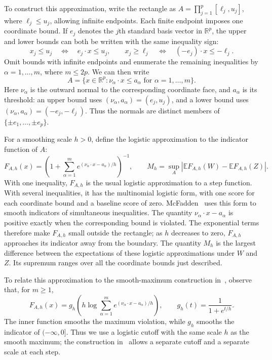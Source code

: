 \documentclass[11pt,letterpaper]{article}
\newif\ifshowrev
\newcommand{\rev}[1]{\ifshowrev{\color{revblue}%
\hypersetup{linkcolor=revblue,citecolor=revblue,urlcolor=revblue}#1}\else#1\fi}
\newif\ifshownat
\newcommand{\nat}[1]{\ifshownat{\color{revblue}%
\hypersetup{linkcolor=revblue,citecolor=revblue,urlcolor=revblue}#1}\else#1\fi}
\theoremstyle{remark}
\newcommand{\E}{\mathbb E}
\newcommand{\R}{\mathbb R}
\begin{document}
To construct this approximation, write the rectangle as
\(A=\prod_{j=1}^p[\ell_j,u_j]\), where \(\ell_j\le u_j\),
allowing infinite endpoints.
Each finite endpoint imposes one coordinate bound. If \(e_j\) denotes
the \(j\)th standard basis vector in \(\R^p\), the upper and lower
bounds can both be written with the same inequality sign:
\[
 x_j\le u_j
 \quad\Longleftrightarrow\quad e_j\cdot x\le u_j,
 \qquad
 x_j\ge\ell_j
 \quad\Longleftrightarrow\quad (-e_j)\cdot x\le-\ell_j.
\]
Omit bounds with infinite endpoints and enumerate the remaining
inequalities by \(\alpha=1,\ldots,m\), where \(m\le2p\). We can
then write
\[
 A=\{x\in\R^p:\nu_\alpha\cdot x\le a_\alpha
                 \text{ for }\alpha=1,\ldots,m\}.
\]
Here \(\nu_\alpha\) is the outward normal to the corresponding
coordinate face, and \(a_\alpha\) is its threshold: an upper bound
uses \((\nu_\alpha,a_\alpha)=(e_j,u_j)\), and a lower bound uses
\((\nu_\alpha,a_\alpha)=(-e_j,-\ell_j)\).
Thus the normals are distinct members of
\(\{\pm e_1,\ldots,\pm e_p\}\).

For a smoothing scale \(h>0\), define the logistic approximation to
the indicator function of \(A\):
\begin{equation}
 F_{A,h}(x)=\left(1+\sum_{\alpha=1}^m
          e^{(\nu_\alpha\cdot x-a_\alpha)/h}\right)^{-1},
 \qquad M_h=\sup_A|\E F_{A,h}(W)-\E F_{A,h}(Z)|.
 \label{eq:selector}
\end{equation}
With one inequality, \(F_{A,h}\) is the usual logistic approximation
to a step function. With several inequalities, it has the multinomial
logistic form, with one score for each coordinate bound and a baseline
score of zero. McFadden~\cite[p.~1001]{McFadden1989} uses this form
to smooth indicators of simultaneous inequalities.
\rev{}
The quantity \(\nu_\alpha\cdot x-a_\alpha\) is positive exactly
when the corresponding bound is violated. The exponential terms
therefore make \(F_{A,h}\) small outside the rectangle; as \(h\)
decreases to zero, \(F_{A,h}\) approaches its indicator away from
the boundary. The quantity \(M_h\) is the largest difference between
the expectations of these logistic approximations under \(W\) and \(Z\).
Its supremum ranges over all the coordinate bounds just described.

To relate this approximation to the smooth-maximum construction
in~\cite{CCK2013}, observe that, for \(m\ge1\),
\[
 F_{A,h}(x)=g_h\!\left(h\log\sum_{\alpha=1}^m
 e^{(\nu_\alpha\cdot x-a_\alpha)/h}\right),
 \qquad g_h(t)=\frac{1}{1+e^{t/h}}.
\]
The inner function smooths the maximum violation, while \(g_h\)
smooths the indicator of \(({-\infty},0]\). Thus we use a logistic
cutoff with the same scale \(h\) as the smooth maximum; the
construction in~\cite{CCK2013} allows a separate cutoff and a
separate scale at each step.
\end{document}
